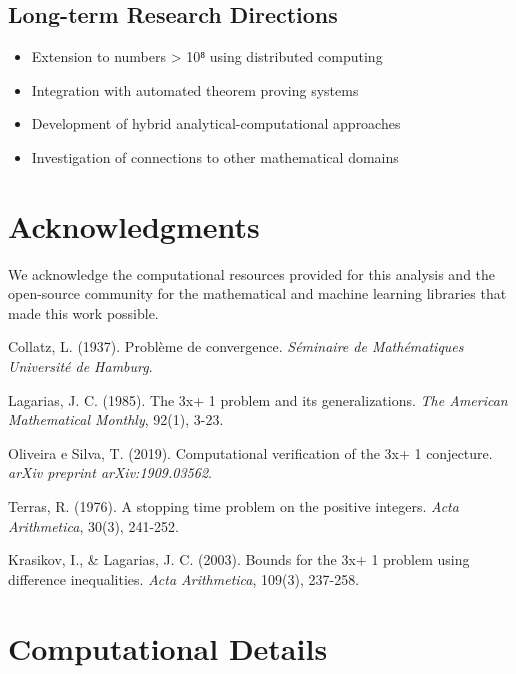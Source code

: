 \documentclass[12pt,a4paper]{article}
\begin{document}
\subsection{Long-term Research Directions}
\begin{itemize}
\item Extension to numbers > 10⁸ using distributed computing
\item Integration with automated theorem proving systems
\item Development of hybrid analytical-computational approaches
\item Investigation of connections to other mathematical domains
\end{itemize}

\section*{Acknowledgments}

We acknowledge the computational resources provided for this analysis and the open-source community for the mathematical and machine learning libraries that made this work possible.


\begin{thebibliography}{9}

Collatz, L. (1937). 
Problème de convergence. 
\textit{Séminaire de Mathématiques Université de Hamburg}.

Lagarias, J. C. (1985). 
The 3x+ 1 problem and its generalizations. 
\textit{The American Mathematical Monthly}, 92(1), 3-23.

Oliveira e Silva, T. (2019). 
Computational verification of the 3x+ 1 conjecture. 
\textit{arXiv preprint arXiv:1909.03562}.

Terras, R. (1976). 
A stopping time problem on the positive integers. 
\textit{Acta Arithmetica}, 30(3), 241-252.

Krasikov, I., \& Lagarias, J. C. (2003). 
Bounds for the 3x+ 1 problem using difference inequalities. 
\textit{Acta Arithmetica}, 109(3), 237-258.

\end{thebibliography}

\appendix

\section{Computational Details}
\end{document}
